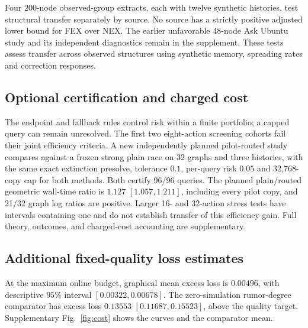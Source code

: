 \documentclass[preprint,11pt,sort&compress]{elsarticle}
\begin{document}
Four 200-node observed-group extracts, each with twelve synthetic histories, test structural transfer separately by source. No source has a strictly positive adjusted lower bound for FEX over NEX. The earlier unfavorable 48-node Ask Ubuntu study and its independent diagnostics remain in the supplement. These tests assess transfer across observed structures using synthetic memory, spreading rates and correction responses.


\subsection{Optional certification and charged cost}\label{sec:certification_details}

The endpoint and fallback rules control risk within a finite portfolio; a capped query can remain unresolved. The first two eight-action screening cohorts fail their joint efficiency criteria. A new independently planned pilot-routed study compares against a frozen strong plain race on 32 graphs and three histories, with the same exact extinction presolve, tolerance $0.1$, per-query risk $0.05$ and 32,768-copy cap for both methods. Both certify 96/96 queries. The planned plain/routed geometric wall-time ratio is $1.127$ $[1.057,1.211]$, including every pilot copy, and 21/32 graph log ratios are positive. Larger 16- and 32-action stress tests have intervals containing one and do not establish transfer of this efficiency gain. Full theory, outcomes, and charged-cost accounting are supplementary.



\subsection{Additional fixed-quality loss estimates}\label{sec:quality_estimates}
At the maximum online budget, graphical mean excess loss is $0.00496$, with descriptive $95\%$ interval $[0.00322,0.00678]$. The zero-simulation rumor-degree comparator has excess loss $0.13553$ $[0.11687,0.15523]$, above the quality target. Supplementary Fig.~\ref{fig:cost} shows the curves and the comparator mean.
\end{document}
